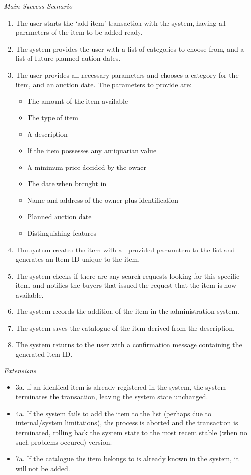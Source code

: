 \textsl{Main Success Scenario}
\begin{enumerate}[noitemsep]
	\item The user starts the `add item' transaction with the system, having all parameters of the item to be added ready.
	\item The system provides the user with a list of categories to choose from, and a list of future planned aution dates.
	\item The user provides all necessary parameters and chooses a category for the item, and an auction date. The parameters to provide are:
	\begin{itemize}[noitemsep]
		\item The amount of the item available
		\item The type of item
		\item A description
		\item If the item possesses any antiquarian value
		\item A minimum price decided by the owner
		\item The date when brought in
		\item Name and address of the owner plus identification
		\item Planned auction date
		\item Distinguishing features
	\end{itemize}
	\item The system creates the item with all provided parameters to the list and generates an Item ID unique to the item.
	\item The system checks if there are any search requests looking for this specific item, and notifies the buyers that issued the request that the item is now available.
	\item The system records the addition of the item in the administration system.
	\item The system saves the catalogue of the item derived from the description.
	\item The system returns to the user with a confirmation message containing the generated item ID.
\end{enumerate}
\textsl{Extensions}
\begin{itemize}[noitemsep]
	\item 3a. If an identical item is already registered in the system, the system terminates the transaction, leaving the system state unchanged.
	\item 4a. If the system fails to add the item to the list (perhaps due to internal/system limitations), the process is aborted and the transaction is terminated, rolling back the system state to the most recent stable (when no such problems occured) version.
	\item 7a. If the catalogue the item belongs to is already known in the system, it will not be added.
\end{itemize}
